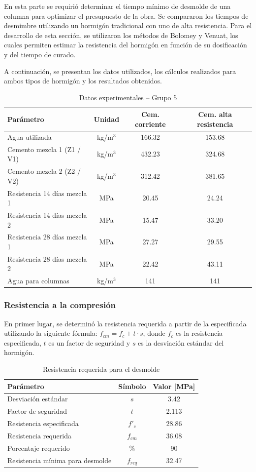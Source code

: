 En esta parte se requirió determinar el tiempo mínimo de desmolde de una columna para optimizar el presupuesto de la obra. Se compararon los tiempos de desmimbre utilizando un hormigón tradicional con uno de alta resistencia. 
Para el desarrollo de esta sección, se utilizaron los métodos de Bolomey y Venuat, los cuales permiten estimar la resistencia del hormigón en función de su dosificación y del tiempo de curado.

A continuación, se presentan los datos utilizados, los cálculos realizados para ambos tipos de hormigón y los resultados obtenidos.

\begin{table}[H]
\centering
\caption{Datos experimentales – Grupo 5}
\renewcommand{\arraystretch}{1.15}
\small
\begin{tabular}{lccc}
\hline
\textbf{Parámetro} & \textbf{Unidad} & \textbf{Cem. corriente} & \textbf{Cem. alta resistencia} \\ \hline
Agua utilizada & kg/m$^3$ & 166.32 & 153.68 \\
Cemento mezcla 1 (Z1 / V1) & kg/m$^3$ & 432.23 & 324.68 \\
Cemento mezcla 2 (Z2 / V2) & kg/m$^3$ & 312.42 & 381.65 \\
Resistencia 14 días mezcla 1 & MPa & 20.45 & 24.24 \\
Resistencia 14 días mezcla 2 & MPa & 15.47 & 33.20 \\
Resistencia 28 días mezcla 1 & MPa & 27.27 & 29.55 \\
Resistencia 28 días mezcla 2 & MPa & 22.42 & 43.11 \\
Agua para columnas & kg/m$^3$ & 141 & 141\\ \hline
\end{tabular}
\end{table}

\subsubsection*{Resistencia a la compresión}

En primer lugar, se determinó la resistencia requerida a partir de la especificada utilizando la siguiente fórmula: $f_{cm} = f_c + t \cdot s$, donde $f_c$ es la resistencia especificada, $t$ es un factor de seguridad y $s$ es la desviación estándar del hormigón.

\begin{table}[H]
\centering
\caption{Resistencia requerida para el desmolde}
\begin{tabular}{lcc}
\hline
Parámetro & Símbolo & Valor [MPa] \\ \hline
Desviación estándar & $s$ & 3.42 \\
Factor de seguridad & $t$ & 2.113 \\
Resistencia especificada & $f'_c$ & 28.86 \\
Resistencia requerida & $f_{cm}$ & 36.08 \\
Porcentaje requerido & \% & 90 \\
Resistencia mínima para desmolde & $f_{req}$ & 32.47 \\ \hline
\end{tabular}
\end{table}

